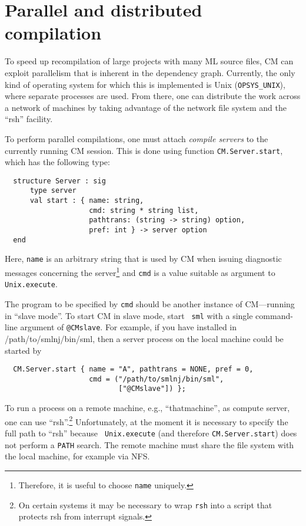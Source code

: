 %

\chapter{Parallel and distributed compilation}
\label{chap:parmake}

To speed up recompilation of large projects with many ML source files,
CM can exploit parallelism that is inherent in the dependency graph.
Currently, the only kind of operating system for which this is
implemented is Unix ({\tt OPSYS\_UNIX}), where separate processes are
used.  From there, one can distribute the work across a network of
machines by taking advantage of the network file system and the
``rsh'' facility.

To perform parallel compilations, one must attach {\em compile
servers} to the currently running CM session.  This is done using
function {\tt CM.Server.start}, which has the following type:

\begin{lstlisting}
  structure Server : sig
      type server
      val start : { name: string,
                    cmd: string * string list,
                    pathtrans: (string -> string) option,
                    pref: int } -> server option
  end
\end{lstlisting}%

Here, {\tt name} is an arbitrary string that is used by CM when
issuing diagnostic messages concerning the server\footnote{Therefore,
it is useful to choose {\tt name} uniquely.} and {\tt cmd} is a value
suitable as argument to {\tt Unix.execute}.

The program to be specified by {\tt cmd} should be another instance of
CM---running in ``slave mode''.  To start CM in slave mode, start {\tt
sml} with a single command-line argument of {\tt @CMslave}.  For
example, if you have installed in /path/to/smlnj/bin/sml, then a
server process on the local machine could be started by

\begin{lstlisting}
  CM.Server.start { name = "A", pathtrans = NONE, pref = 0,
                    cmd = ("/path/to/smlnj/bin/sml",
                           ["@CMslave"]) };
\end{lstlisting}%

To run a process on a remote machine, e.g., ``thatmachine'', as
compute server, one can use ``rsh''.\footnote{On certain systems it
may be necessary to wrap {\tt rsh} into a script that protects rsh
from interrupt signals.}  Unfortunately, at the moment it
is necessary to specify the full path to ``rsh'' because {\tt
Unix.execute} (and therefore {\tt CM.Server.start}) does not perform
a {\tt PATH} search. The remote machine
must share the file system with the local machine, for example via NFS.

